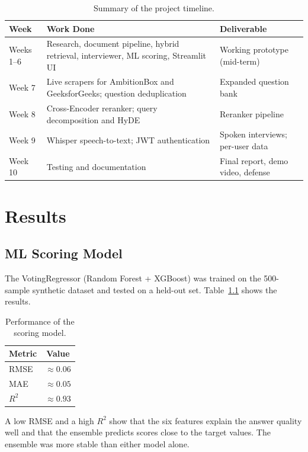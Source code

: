\documentclass[11pt,a4paper]{report}
\begin{document}
\begin{table}[H]
\centering
\begin{tabularx}{\textwidth}{lXX}
\toprule
\textbf{Week} & \textbf{Work Done} & \textbf{Deliverable}\\
\midrule
Weeks 1--6 & Research, document pipeline, hybrid retrieval, interviewer, ML scoring, Streamlit UI & Working prototype (mid-term)\\
Week 7 & Live scrapers for AmbitionBox and GeeksforGeeks; question deduplication & Expanded question bank\\
Week 8 & Cross-Encoder reranker; query decomposition and HyDE & Reranker pipeline\\
Week 9 & Whisper speech-to-text; JWT authentication & Spoken interviews; per-user data\\
Week 10 & Testing and documentation & Final report, demo video, defense\\
\bottomrule
\end{tabularx}
\caption{Summary of the project timeline.}
\end{table}

\chapter{Results}

\section{ML Scoring Model}

The VotingRegressor (Random Forest + XGBoost) was trained on the 500-sample synthetic dataset and tested on a held-out set. Table~\ref{tab:ml} shows the results.

\begin{table}[H]
\centering
\begin{tabular}{lc}
\toprule
\textbf{Metric} & \textbf{Value}\\
\midrule
RMSE & $\approx 0.06$\\
MAE & $\approx 0.05$\\
$R^2$ & $\approx 0.93$\\
\bottomrule
\end{tabular}
\caption{Performance of the scoring model.}
\label{tab:ml}
\end{table}

A low RMSE and a high $R^2$ show that the six features explain the answer quality well and that the ensemble predicts scores close to the target values. The ensemble was more stable than either model alone.
\end{document}

